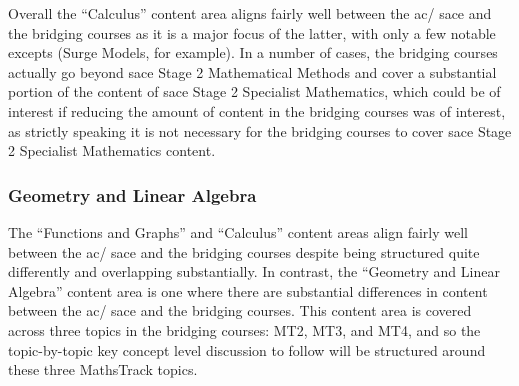 \documentclass[twoside,12pt,a4paper]{report}
\begin{document}
Overall the ``Calculus'' content area aligns fairly well between the \gls{ac}/ \gls{sace} and the bridging courses as it is a major focus of the latter, with only a few notable excepts (Surge Models, for example). In a number of cases, the bridging courses actually go beyond \gls{sace} Stage 2 Mathematical Methods and cover a substantial portion of the content of \gls{sace} Stage 2 Specialist Mathematics, which could be of interest if reducing the amount of content in the bridging courses was of interest, as strictly speaking it is not necessary for the bridging courses to cover \gls{sace} Stage 2 Specialist Mathematics content.

\subsubsection{Geometry and Linear Algebra}

The ``Functions and Graphs'' and ``Calculus'' content areas align fairly well between the \gls{ac}/ \gls{sace} and the bridging courses despite being structured quite differently and overlapping substantially. In contrast, the ``Geometry and Linear Algebra'' content area is one where there are substantial differences in content between the \gls{ac}/ \gls{sace} and the bridging courses. This content area is covered across three topics in the bridging courses: MT2, MT3, and MT4, and so the topic-by-topic key concept level discussion to follow will be structured around these three MathsTrack topics.
\end{document}
